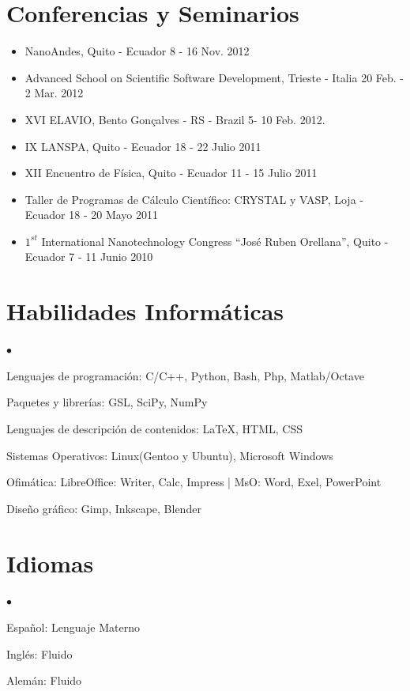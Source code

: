 \documentclass[margin,line]{res}
\newenvironment{list2}{
  \begin{list}{$\bullet$}{%
      \setlength{\itemsep}{0in}
      \setlength{\parsep}{0in} \setlength{\parskip}{0in}
      \setlength{\topsep}{0in} \setlength{\partopsep}{0in} 
      \setlength{\leftmargin}{0.2in}}}{\end{list}}
\begin{document}
\begin{resume}
\section{\sc Conferencias y Seminarios}
\begin{itemize}
 \item NanoAndes, Quito - Ecuador \hfill 8 - 16 Nov. 2012
 \item Advanced School on Scientific Software Development, Trieste - Italia \hfill 20 Feb. - 2 Mar. 2012
 \item XVI ELAVIO, Bento Gonçalves - RS - Brazil \hfill 5- 10 Feb. 2012.
 \item IX LANSPA, Quito - Ecuador \hfill 18 - 22 Julio 2011
 \item XII Encuentro de Física, Quito - Ecuador \hfill 11 - 15 Julio 2011
 \item Taller de Programas de Cálculo Científico: CRYSTAL y VASP, Loja - Ecuador \hfill 18 - 20 Mayo 2011
 \item $1^{st}$ International Nanotechnology Congress ``José Ruben Orellana'', Quito - Ecuador \hfill 7 - 11 Junio 2010
 
\end{itemize}


\section{\sc Habilidades Informáticas}
  \begin{list2}
    \item Lenguajes de programación:  C/C++, Python, Bash, Php, Matlab/Octave
    \item Paquetes y librerías: GSL, SciPy, NumPy
    \item Lenguajes de descripción de contenidos: \LaTeX, HTML, CSS
    \item Sistemas Operativos: Linux(Gentoo y Ubuntu), Microsoft Windows
    \item Ofimática: LibreOffice: Writer, Calc, Impress | MsO: Word, Exel, PowerPoint
    \item Diseño gráfico: Gimp, Inkscape, Blender
  \end{list2}

\section{\sc Idiomas}
  \begin{list2}
    \item Español: Lenguaje Materno
    \item Inglés: Fluido
    \item Alemán: Fluido
  \end{list2}
  

\end{resume}
\end{document}
